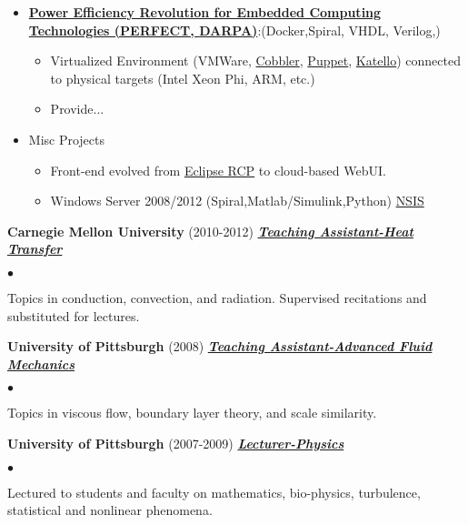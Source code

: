 \documentclass{article}
\newcommand{\employer}[3]{{ \textbf{#1} (#2) \underline{\textbf{\emph{#3}}}\\  }}
\newenvironment{achievements}{\begin{list}{$\bullet$}{\topsep 0pt \itemsep -2pt}}{\vspace*{4pt}\end{list}}
\begin{document}
\begin{itemize}
\item \textbf{\href{http://www.darpa.mil/Our_Work/MTO/Programs/Power_Efficiency_Revolution_for_Embedded_Computing_Technologies_(PERFECT).aspx}{Power Efficiency Revolution for Embedded Computing Technologies (PERFECT, \href{http://www.darpa.mil/default.aspx}{DARPA})}}:(Docker,Spiral, VHDL, Verilog,)

  \begin{itemize}
    \item Virtualized Environment (VMWare, \href{http://cobbler.github.io/}{Cobbler}, \href{https://puppetlabs.com/}{Puppet}, \href{http://www.katello.org/}{Katello}) connected to physical targets (Intel Xeon Phi, ARM, etc.)
    \item Provide...
  \end{itemize}

\item Misc Projects
  \begin{itemize}
    \item Front-end evolved from \href{https://wiki.eclipse.org/index.php/Rich_Client_Platform}{Eclipse RCP} to cloud-based WebUI. 
    \item Windows Server 2008/2012 (Spiral,Matlab/Simulink,Python) \href{http://nsis.sourceforge.net/Main_Page}{NSIS}
  \end{itemize}

\end{itemize}


\employer{Carnegie Mellon University}{2010-2012}{Teaching Assistant-Heat Transfer}
	\begin{achievements}
	\item Topics in conduction, convection, and radiation. Supervised recitations and substituted for lectures. 
	\end{achievements}

\employer{University of Pittsburgh}{2008}{Teaching Assistant-Advanced Fluid Mechanics}
	\begin{achievements}
	\item Topics in viscous flow, boundary layer theory, and scale similarity. 
	\end{achievements}

\employer{University of Pittsburgh}{2007-2009}{Lecturer-Physics}
	\begin{achievements}
	\item Lectured to students and faculty on mathematics, bio-physics, turbulence, statistical and nonlinear phenomena. 
	\end{achievements}
\end{document}
